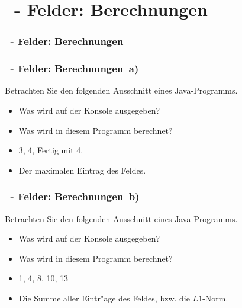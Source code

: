 \def\stitle{\theexercise\ - Felder: Berechnungen}
\section{\stitle}
\begin{frame}
  \frametitle{\stitle}%
\tableofcontents[current]
\end{frame}



\begin{frame}[t]%
    \frametitle{\stitle ~a)}
Betrachten Sie den folgenden Ausschnitt eines Java-Programms.

\begin{itemize}
    \item Was wird auf der Konsole ausgegeben?
    \item Was wird in diesem Programm berechnet?
    \pause
    \item 3, 4, Fertig mit 4.
    \item Der maximalen Eintrag des Feldes.
\end{itemize}
\end{frame}

\begin{frame}[t]%
    \frametitle{\stitle ~b)}
Betrachten Sie den folgenden Ausschnitt eines Java-Programms.

\begin{itemize}
    \item Was wird auf der Konsole ausgegeben?
    \item Was wird in diesem Programm berechnet?
    \pause
    \item 1, 4, 8, 10, 13
    \item Die Summe aller Eintr"age des Feldes, bzw. die $L1$-Norm.
\end{itemize}
\end{frame}